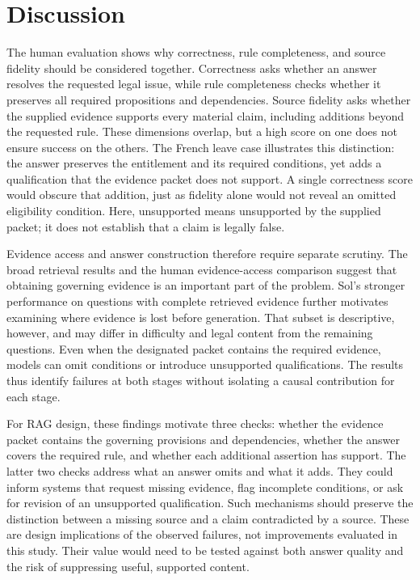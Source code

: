 \documentclass[11pt]{article}
\DeclareRobustCommand{\claim}[2]{#2}
\begin{document}
\FloatBarrier

\section{Discussion}
\claim{DISCUSSION}{The human evaluation shows why correctness, rule completeness, and source fidelity should be considered together. Correctness asks whether an answer resolves the requested legal issue, while rule completeness checks whether it preserves all required propositions and dependencies. Source fidelity asks whether the supplied evidence supports every material claim, including additions beyond the requested rule. These dimensions overlap, but a high score on one does not ensure success on the others. The French leave case illustrates this distinction: the answer preserves the entitlement and its required conditions, yet adds a qualification that the evidence packet does not support. A single correctness score would obscure that addition, just as fidelity alone would not reveal an omitted eligibility condition. Here, unsupported means unsupported by the supplied packet; it does not establish that a claim is legally false.}

\claim{DISCUSSION}{Evidence access and answer construction therefore require separate scrutiny. The broad retrieval results and the human evidence-access comparison suggest that obtaining governing evidence is an important part of the problem. Sol's stronger performance on questions with complete retrieved evidence further motivates examining where evidence is lost before generation. That subset is descriptive, however, and may differ in difficulty and legal content from the remaining questions. Even when the designated packet contains the required evidence, models can omit conditions or introduce unsupported qualifications. The results thus identify failures at both stages without isolating a causal contribution for each stage.}

\claim{DISCUSSION}{For RAG design, these findings motivate three checks: whether the evidence packet contains the governing provisions and dependencies, whether the answer covers the required rule, and whether each additional assertion has support. The latter two checks address what an answer omits and what it adds. They could inform systems that request missing evidence, flag incomplete conditions, or ask for revision of an unsupported qualification. Such mechanisms should preserve the distinction between a missing source and a claim contradicted by a source. These are design implications of the observed failures, not improvements evaluated in this study. Their value would need to be tested against both answer quality and the risk of suppressing useful, supported content.}
\end{document}
